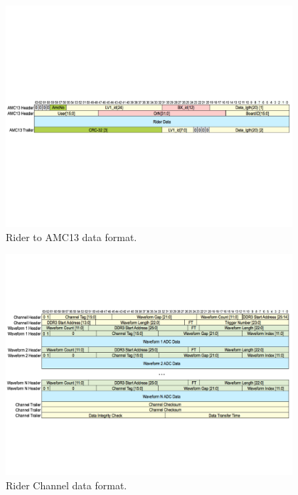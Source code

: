 \documentclass[12pt,letterpaper]{article}
\begin{document}
\begin{figure}[htbp]
\centering
\includegraphics[trim=0cm 9.5cm 0cm 9.5cm ,width=0.95\textwidth]{pics/RiderToAMC13Header}
\caption{Rider to AMC13 data format.}
\end{figure}

\begin{figure}[htbp]
\centering
\includegraphics[trim=0cm 5.5cm 0cm 5.5cm ,width=0.95\textwidth]{pics/RiderChannelHeader}
\caption{Rider Channel data format.}
\end{figure}
\end{document}
